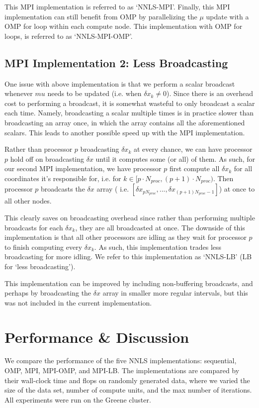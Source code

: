 \documentclass{article}
\begin{document}
This MPI implementation is referred to as `NNLS-MPI'. Finally, this MPI implementation can still benefit from OMP by parallelizing the $\mu$ update with a OMP for loop within each compute node. This implementation with OMP for loops, is referred to as `NNLS-MPI-OMP'.

\subsection{MPI Implementation 2: Less Broadcasting}
One issue with above implementation is that we perform a scalar broadcast whenever $mu$ needs to be updated (i.e. when $\delta x_k \neq 0$). Since there is an overhead cost to performing a broadcast, it is somewhat wasteful to only broadcast a scalar each time. Namely, broadcasting a scalar multiple times is in practice slower than broadcasting an array once, in which the array contains all the aforementioned scalars. This leads to another possible speed up with the MPI implementation.

Rather than processor $p$ broadcasting $\delta x_k$ at every chance, we can have processor $p$ hold off on broadcasting $\delta x$ until it computes some (or all) of them. As such, for our second MPI implementation, we have processor $p$ first compute all $\delta x_k$ for all coordinates it's responsible for, i.e. for $k \in [p \cdot N_{proc}, (p+1) \cdot N_{proc} )$. Then processor $p$ broadcasts the $\delta x$ array ( i.e. $[ \delta x_{pN_{proc}}, ... , \delta x_{(p+1) N_{proc} - 1}]$) at once to all other nodes.

This clearly saves on broadcasting overhead since rather than performing multiple broadcasts for each $\delta x_k$, they are all broadcasted at once. The downside of this implementation is that all other processors are idling as they wait for processor $p$ to finish computing every $\delta x_k$. As such, this implementation trades less broadcasting for more idling. We refer to this implementation as `NNLS-LB' (LB for `less broadcasting').

This implementation can be improved by including non-buffering broadcasts, and perhaps by broadcasting the $\delta x$ array in smaller more regular intervals, but this was not included in the current implementation.


\section*{Performance \& Discussion}
We compare the performance of the five NNLS implementations: sequential, OMP, MPI, MPI-OMP, and MPI-LB. The implementations are compared by their wall-clock time and flops on randomly generated data, where we varied the size of the data set, number of compute units, and the max number of iterations. All experiments were run on the Greene cluster.
\end{document}
